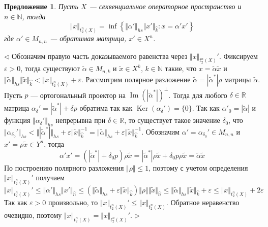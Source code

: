 \documentclass[12pt]{article}
\newtheorem{proposition}[theorem]{Предложение}
\newenvironment{proof}{\par $\triangleleft$}{$\triangleright$}
\begin{document}
\begin{proposition}\label{PrT2nNormProperty}
Пусть $X$ --- секвенциальное операторное пространство и $n\in\mathbb{N}$, тогда
$$
\Vert x\Vert_{t_2^n(X)}=\inf\left\{\Vert\alpha'\Vert_{hs}\Vert x'\Vert_{\wideparen{k}}:x=\alpha'x'\right\}
$$
где $\alpha'\in M_{n,n}$ --- обратимая матрица, $x'\in X^{n}$.
\end{proposition}
\begin{proof}
Обозначим правую часть доказываемого равенства через $\Vert x\Vert_{t_2^n(X)}'$. Фиксируем $\varepsilon>0$, тогда существуют $\tilde{\alpha}\in M_{n,k}$ и $\tilde{x}\in X^{k}$, $k\in\mathbb{N}$ такие, что 
$x=\tilde{\alpha}\tilde{x}$ и $\Vert\tilde{\alpha}\Vert_{hs}\Vert\tilde{x}\Vert_{\wideparen{k}}<\Vert x\Vert_{t_2^n(X)}+\varepsilon$. Рассмотрим полярное разложение 
$\tilde{\alpha}=|\tilde{\alpha}^*| \rho$ матрицы $\tilde{\alpha}$. Пусть $p$ --- ортогональный проектор на $\operatorname{Im}(|\tilde{\alpha}^*|)^\perp$. Тогда для любого $\delta\in\mathbb{R}$ матрица 
$\alpha_\delta'=|\tilde{\alpha}^*|+\delta p$ обратима так как $\operatorname{Ker}(\alpha_\delta')=\{0\}$. Так как $\alpha'_0=|\tilde{\alpha}|$ и функция $\Vert\alpha_\delta'\Vert_{hs}$ непрерывна при 
$\delta\in\mathbb{R}$, то существует такое значение $\delta_0$, что 
$\Vert\alpha_{\delta_0}'\Vert_{hs}<\Vert|\tilde{\alpha}^*|\Vert_{hs}+\varepsilon\Vert \tilde{x}\Vert_{\wideparen{k}}^{-1}=\Vert\tilde{\alpha}\Vert_{hs}+\varepsilon\Vert \tilde{x}\Vert_{\wideparen{k}}^{-1}$. 
Обозначим $\alpha'=\alpha_{\delta_0}'\in M_{n,n}$ и $x'=\rho\tilde{x}\in Y^n$, тогда 
$$
\alpha'x'
=(|\tilde{\alpha}^*|+\delta_0 p)\rho \tilde{x}
=|\tilde{\alpha}^*|\rho \tilde{x}+\delta_0 p\rho \tilde{x}
=\tilde{\alpha}\tilde{x}
$$
По построению полярного разложения $\Vert \rho\Vert\leq 1$, поэтому с учетом определения $\Vert x\Vert_{t_2^n(X)}'$ получаем
$$
\Vert x\Vert_{t_2^n(X)}'\leq
\Vert\alpha'\Vert_{hs}\Vert x'\Vert_{\wideparen{n}}
\leq (\Vert\tilde{\alpha}\Vert_{hs}+\varepsilon\Vert \tilde{x}\Vert_{\wideparen{k}})\Vert \rho\Vert\Vert\tilde{x}\Vert_{\wideparen{n}}
\leq\Vert\tilde{\alpha}\Vert_{hs}\Vert\tilde{x}\Vert_{\wideparen{k}}+\varepsilon
\leq \Vert x\Vert_{t_2^n(X)}+2\varepsilon
$$
Так как $\varepsilon>0$ произвольно, то $\Vert x\Vert_{t_2^n(X)}'\leq\Vert x\Vert_{t_2^n(X)}$. Обратное неравенство очевидно, поэтому $\Vert x\Vert_{t_2^n(X)}=\Vert x\Vert_{t_2^n(X)}'$.
\end{proof}
\end{document}
